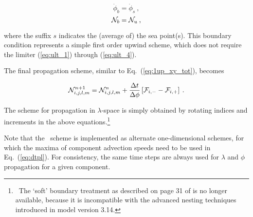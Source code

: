 
\begin{equation}
\dot{\phi}_b = \dot{\phi}_s \: ,
\label{eq:1_vel} \end{equation} \begin{equation}
\cN_b = \cN_u \: ,
\label{eq:1_bval} \end{equation}

\noindent
where the suffix $s$ indicates the (average of) the sea point(s). This
boundary condition represents a simple first order upwind scheme, which does
not require the limiter (\ref{eq:ult_1}) through (\ref{eq:ult_4}).

The final propagation scheme, similar to Eq.~(\ref{eq:1up_xy_tot}),  becomes


\begin{equation}
\cN_{i,j,l,m}^{n+1} = \cN_{i,j,l,m}^n +
\frac{\Delta t}{\Delta \phi} \left [ \cF_{i,-} - \cF_{i,+} \right ]
\: . \label{eq:uq_xy_tot} \end{equation}

\noindent
The scheme for propagation in $\lambda$-space is simply obtained by rotating
indices and increments in the above equations.\footnote{~The `soft' boundary
treatment as described on page 31 of \cite{tol:OMB02c} is no longer available,
because it is incompatible with the advanced nesting techniques introduced in
model version 3.14.}

Note that the \uq\ scheme is implemented as alternate one-dimensional schemes,
for which the maxima of component advection speeds need to be used in
Eq.~(\ref{eq:dtpl}). For consistency, the same time steps are always used for
$\lambda$ and $\phi$ propagation for a given component.

